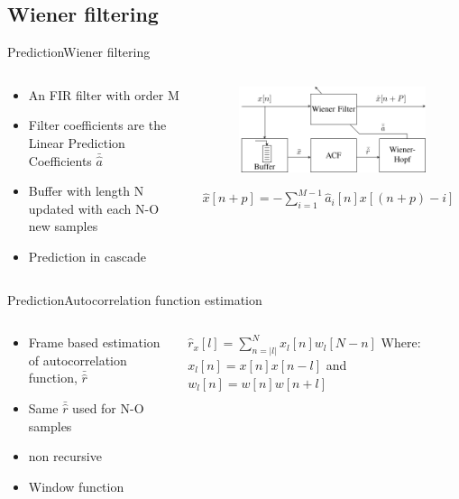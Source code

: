 \subsection{Wiener filtering}
\begin{frame}{Prediction}{Wiener filtering}
	\begin{columns}
		\begin{column}{0.5\textwidth}
			\begin{itemize}
				\item An FIR filter with order M
				\item Filter coefficients are the Linear Prediction Coefficients $\bar{\hat{a}}$
				\item Buffer with length N updated with each N-O new samples
				\item Prediction in cascade 
			\end{itemize}
		\end{column}
		\begin{column}{0.5\textwidth} 
			\begin{figure}
				\includegraphics[width=\textwidth]{figures/WienerHopf}
			\end{figure}
		$\hat{x}[n+p] =- \sum^{M-1}_{i=1}\hat{a}_i[n]x[(n+p)-i]$
		\end{column}
	\end{columns}
\end{frame}

\begin{frame}{Prediction}{Autocorrelation function estimation}
	\begin{columns}
		\begin{column}{0.5\textwidth}
			\begin{itemize}
				\item Frame based estimation of autocorrelation function, $\bar{\hat{r}}$
				\item Same  $\bar{\hat{r}}$ used for N-O samples
				\item non recursive
				\item Window function
			\end{itemize}
		\end{column}
		\begin{column}{0.5\textwidth} 
			$\hat{r}_x[l] = \sum^{N}_{n=\left| l\right|} x_l[n]w_l[N-n]$
			\vspace{5mm}
			Where: 
			$x_l[n]=x[n]x[n-l]$ and $w_l[n]=w[n]w[n+l]$
		\end{column}
	\end{columns}
\end{frame}

